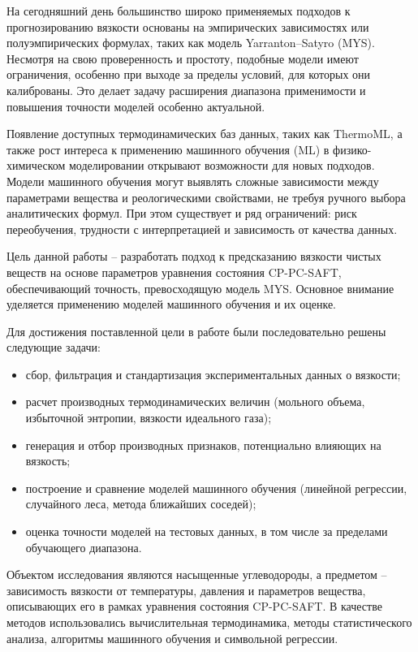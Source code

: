 \documentclass[a4paper,12pt]{article}
\begin{document}
  На сегодняшний день большинство широко применяемых подходов к прогнозированию вязкости основаны на эмпирических зависимостях или полуэмпирических формулах, таких как модель Yarranton–Satyro (MYS). Несмотря на свою проверенность и простоту, подобные модели имеют ограничения, особенно при выходе за пределы условий, для которых они калиброваны. Это делает задачу расширения диапазона применимости и повышения точности моделей особенно актуальной.
  
  Появление доступных термодинамических баз данных, таких как ThermoML, а также рост интереса к применению машинного обучения (ML) в физико-химическом моделировании открывают возможности для новых подходов. Модели машинного обучения могут выявлять сложные зависимости между параметрами вещества и реологическими свойствами, не требуя ручного выбора аналитических формул. При этом существует и ряд ограничений: риск переобучения, трудности с интерпретацией и зависимость от качества данных.
  
  Цель данной работы -- разработать подход к предсказанию вязкости чистых веществ на основе параметров уравнения состояния CP-PC-SAFT, обеспечивающий точность, превосходящую модель MYS. Основное внимание уделяется применению моделей машинного обучения и их оценке.

  Для достижения поставленной цели в работе были последовательно решены следующие задачи:
  \begin{itemize}
    \item сбор, фильтрация и стандартизация экспериментальных данных о вязкости;
    \item расчет производных термодинамических величин (мольного объема, избыточной энтропии, вязкости идеального газа);
    \item генерация и отбор производных признаков, потенциально влияющих на вязкость;
    \item построение и сравнение моделей машинного обучения (линейной регрессии, случайного леса, метода ближайших соседей);
    \item оценка точности моделей на тестовых данных, в том числе за пределами обучающего диапазона.
  \end{itemize}

  Объектом исследования являются насыщенные углеводороды, а предметом -- зависимость вязкости от температуры, давления и параметров вещества, описывающих его в рамках уравнения состояния CP-PC-SAFT. В качестве методов использовались вычислительная термодинамика, методы статистического анализа, алгоритмы машинного обучения и символьной регрессии.
\end{document}
